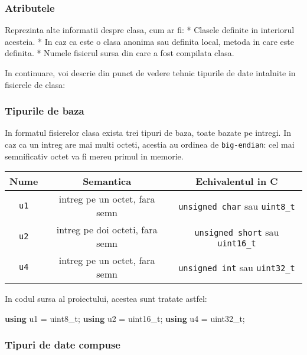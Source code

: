 \documentclass[]{article}
\newenvironment{Shaded}{}{}
\newcommand{\KeywordTok}[1]{\textcolor[rgb]{0.00,0.44,0.13}{\textbf{#1}}}
\newcommand{\DataTypeTok}[1]{\textcolor[rgb]{0.56,0.13,0.00}{#1}}
\newcommand{\NormalTok}[1]{#1}
\begin{document}
\subsubsection{Atributele}\label{atributele}

Reprezinta alte informatii despre clasa, cum ar fi: * Clasele definite
in interiorul acesteia. * In caz ca este o clasa anonima sau definita
local, metoda in care este definita. * Numele fisierul sursa din care a
fost compilata clasa.

In continuare, voi descrie din punct de vedere tehnic tipurile de date
intalnite in fisierele de clasa:

\subsubsection{Tipurile de baza}\label{tipurile-de-baza}

In formatul fisierelor clasa exista trei tipuri de baza, toate bazate pe
intregi. In caz ca un intreg are mai multi octeti, acestia au ordinea de
\texttt{big-endian}: cel mai semnificativ octet va fi mereu primul in
memorie.

\begin{longtable}[]{@{}ccc@{}}
\toprule
Nume & Semantica & Echivalentul in C\tabularnewline
\midrule
\endhead
\texttt{u1} & intreg pe un octet, fara semn & \texttt{unsigned\ char}
sau \texttt{uint8\_t}\tabularnewline
\texttt{u2} & intreg pe doi octeti, fara semn & \texttt{unsigned\ short}
sau \texttt{uint16\_t}\tabularnewline
\texttt{u4} & intreg pe un octet, fara semn & \texttt{unsigned\ int} sau
\texttt{uint32\_t}\tabularnewline
\bottomrule
\end{longtable}

In codul sursa al proiectului, acestea sunt tratate astfel:

\begin{Shaded}
\begin{Highlighting}[]
\KeywordTok{using}\NormalTok{ u1 = }\DataTypeTok{uint8_t}\NormalTok{;}
\KeywordTok{using}\NormalTok{ u2 = }\DataTypeTok{uint16_t}\NormalTok{;}
\KeywordTok{using}\NormalTok{ u4 = }\DataTypeTok{uint32_t}\NormalTok{;}
\end{Highlighting}
\end{Shaded}

\subsubsection{Tipuri de date compuse}\label{tipuri-de-date-compuse}
\end{document}
